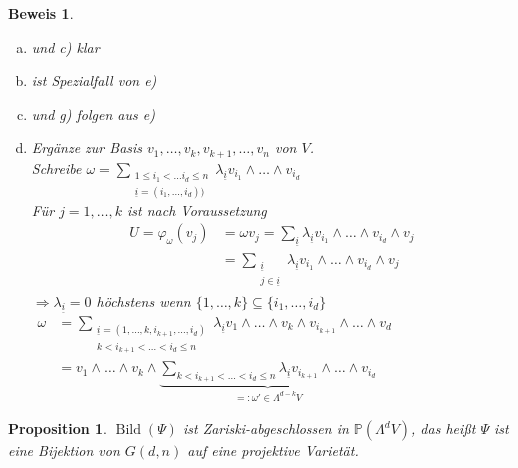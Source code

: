 \documentclass[a4paper,12pt]{report}
\theoremstyle{break}
\newtheorem{Prop}[Def]{Proposition}
\theoremstyle{nonumberbreak}
\newtheorem{Bew}{Beweis}
\theoremstyle{nonumberplain}
\newcommand{\Sum}{\sum\limits}
\DeclareMathOperator{\Bild}{Bild}
\newcommand{\IP}{\mathbb{P}}%
\begin{document}
\begin{Bew}\begin{enumerate}[a)]
\item[b)]
	und c) klar
\item[d)]
	ist Spezialfall von e)
\item[f)]
	und g) folgen aus e)
\item[e)]
	Erg\"anze zur Basis $v_1,\ldots ,v_k,v_{k+1},\ldots ,v_n$ von $V$.\\
	Schreibe $\omega=\Sum_{\substack{1\le i_1<\ldots i_d\le n \\ \underline{i}=(i_1,\ldots ,i_d))}} \lambda_{\underline{i}}v_{i_1}\wedge\ldots \wedge v_{i_d}$\\
	F\"ur $j=1,\ldots ,k$ ist nach Voraussetzung
	\[\begin{array}{rl}
		U=\varphi_{\omega}(v_j)&=\omega v_j=\Sum_{\underline i} \lambda_{\underline{i}}v_{i_1}\wedge\ldots \wedge v_{i_d}\wedge v_j\\
		&=\Sum_{\substack{\underline i\\j\in \underline i}} \lambda_{\underline{i}}v_{i_1}\wedge\ldots \wedge v_{i_d}\wedge v_j
	\end{array}\]
	$\Rightarrow \lambda_{\underline i}=0$ h\"ochstens wenn $\{1,\ldots ,k\}\subseteq\{i_1,\ldots ,i_d\}$\\
	$\begin{array}{rl}\omega&= \Sum_{\substack{\underline{i} =(1,\ldots,k,i_{k+1},\ldots, i_d)\\k<i_{k+1}<\ldots<i_d\le n}} \lambda_{\underline i} v_1\wedge\ldots \wedge v_k \wedge v_{i_{k+1}} \wedge \ldots \wedge v_d\\
	&= v_1 \wedge\ldots \wedge v_k \wedge \underbrace{\Sum_{k<i_{k+1}<\ldots <i_d\le n} \lambda_{\underline i} v_{i_{k+1}}\wedge\ldots \wedge v_{i_d}}_{=: \omega'\in\Lambda^{d-k}V}\end{array}$
\end{enumerate}\end{Bew}

\begin{Prop}
$\Bild(\Psi)$ ist Zariski-abgeschlossen in $\IP(\Lambda^dV)$, das hei\ss t $\Psi$ ist eine Bijektion von $G(d,n)$ auf eine projektive Variet\"at.
\end{Prop}
\end{document}
